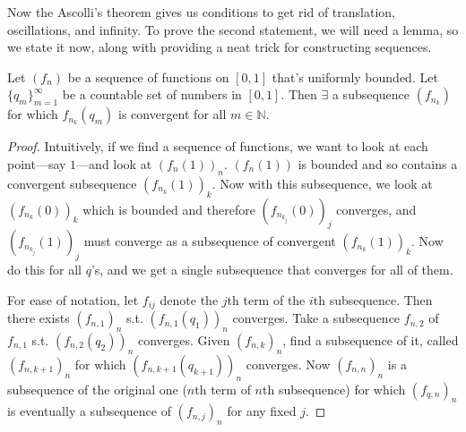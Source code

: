   Now the Ascolli's theorem gives us conditions to get rid of translation, oscillations, and infinity. To prove the second statement, we will need a lemma, so we state it now, along with providing a neat trick for constructing sequences. 

  \begin{lemma} 
    Let $(f_n)$ be a sequence of functions on $[0, 1]$ that's uniformly bounded. Let $\{q_m\}_{m=1}^\infty$ be a countable set of numbers in $[0, 1]$. Then $\exists$ a subsequence $(f_{n_k})$ for which $f_{n_k} (q_m)$ is convergent for all $m \in \mathbb{N}$. 
  \end{lemma}
  \begin{proof}
    Intuitively, if we find a sequence of functions, we want to look at each point---say $1$---and look at $(f_n (1))_n$. $(f_n (1))$ is bounded and so contains a convergent subsequence $(f_{n_k} (1))_k$. Now with this subsequence, we look at $(f_{n_k} (0))_k$ which is bounded and therefore $(f_{n_{k_j}}(0))_j$ converges, and $(f_{n_{k_{j}}}(1))_j$ must converge as a subsequence of convergent $(f_{n_k} (1))_k$. Now do this for all $q$'s, and we get a single subsequence that converges for all of them. 

    For ease of notation, let $f_{ij}$ denote the $j$th term of the $i$th subsequence. Then there exists $(f_{n, 1})_n$ s.t. $(f_{n, 1} (q_1))_n$ converges. Take a subsequence $f_{n, 2}$ of $f_{n, 1}$ s.t. $(f_{n, 2} (q_2))_n$ converges. Given $(f_{n, k})_n$, find a subsequence of it, called $(f_{n, k+1})_n$ for which $(f_{n, k+1} (q_{k+1}))_n$ converges. Now $(f_{n, n})_n$ is a subsequence of the original one ($n$th term of $n$th subsequence) for which $(f_{q, n})_n$ is eventually a subsequence of $(f_{n, j})_n$ for any fixed $j$. 
  \end{proof} 

